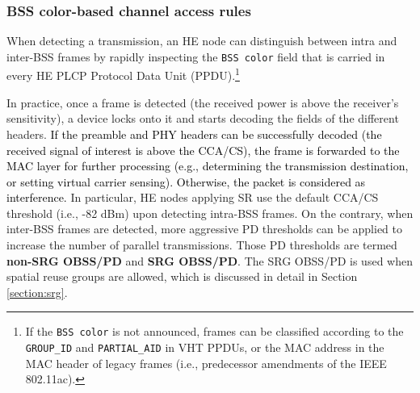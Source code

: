 \documentclass[preprint,12pt]{elsarticle}
\theoremstyle{plain}
\begin{document}
\subsubsection{BSS color-based channel access rules}
\label{section:bss_color_channel_access}
When detecting a transmission, an HE node can distinguish between intra and inter-BSS frames by rapidly inspecting the \texttt{BSS color} field that is carried in every HE PLCP Protocol Data Unit (PPDU).\footnote{If the \texttt{BSS color} is not announced, frames can be classified according to the \texttt{GROUP\_ID} and \texttt{PARTIAL\_AID} in VHT PPDUs, or the MAC address in the MAC header of legacy frames (i.e., predecessor amendments of the IEEE 802.11ac).} 

In practice, once a frame is detected (the received power is above the receiver's sensitivity), a device locks onto it and starts decoding the fields of the different headers. \textcolor{black}{If the preamble and PHY headers can be successfully decoded (the received signal of interest is above the CCA/CS), the frame is forwarded to the MAC layer for further processing (e.g., determining the transmission destination, or setting virtual carrier sensing). Otherwise, the packet is considered as interference.} In particular, HE nodes applying SR use the default CCA/CS threshold (i.e., -82 dBm) upon detecting intra-BSS frames. On the contrary, when inter-BSS frames are detected, more aggressive PD thresholds can be applied to increase the number of parallel transmissions. Those PD thresholds are termed \textbf{non-SRG OBSS/PD} and \textbf{SRG OBSS/PD}. The SRG OBSS/PD is used when spatial reuse groups are allowed, which is discussed in detail in Section \ref{section:srg}.
\end{document}
